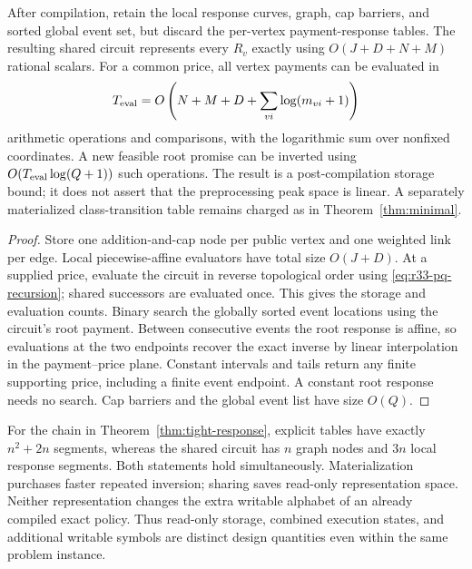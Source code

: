 \begin{proposition}\label{prop:r33-circuit}
After compilation, retain the local response curves, graph, cap barriers, and sorted global event set, but discard the per-vertex payment-response tables. The resulting shared circuit represents every $R_v$ exactly using $O(J+D+N+M)$ rational scalars. For a common price, all vertex payments can be evaluated in
\[
 T_{\rm eval}=O\left(N+M+D+\sum_{vi}\log(m_{vi}+1)\right)
\]
arithmetic operations and comparisons, with the logarithmic sum over nonfixed coordinates. A new feasible root promise can be inverted using $O(T_{\rm eval}\log(Q+1))$ such operations. The result is a post-compilation storage bound; it does not assert that the preprocessing peak space is linear. A separately materialized class-transition table remains charged as in Theorem~\ref{thm:minimal}.
\end{proposition}
\begin{proof}
Store one addition-and-cap node per public vertex and one weighted link per edge. Local piecewise-affine evaluators have total size $O(J+D)$. At a supplied price, evaluate the circuit in reverse topological order using \eqref{eq:r33-pq-recursion}; shared successors are evaluated once. This gives the storage and evaluation counts. Binary search the globally sorted event locations using the circuit's root payment. Between consecutive events the root response is affine, so evaluations at the two endpoints recover the exact inverse by linear interpolation in the payment--price plane. Constant intervals and tails return any finite supporting price, including a finite event endpoint. A constant root response needs no search. Cap barriers and the global event list have size $O(Q)$.
\end{proof}

For the chain in Theorem~\ref{thm:tight-response}, explicit tables have exactly $n^2+2n$ segments, whereas the shared circuit has $n$ graph nodes and $3n$ local response segments. Both statements hold simultaneously. Materialization purchases faster repeated inversion; sharing saves read-only representation space. Neither representation changes the extra writable alphabet of an already compiled exact policy. Thus read-only storage, combined execution states, and additional writable symbols are distinct design quantities even within the same problem instance.

